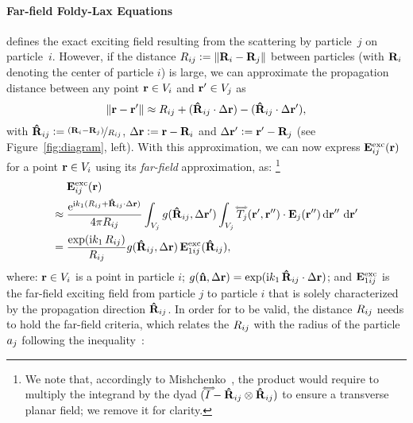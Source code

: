 \paragraph{Far-field Foldy-Lax Equations}
 defines the exact exciting field resulting from the scattering by particle~$j$ on particle~$i$.
However, if the distance $R_{ij} \vcentcolon= \| \mathbf{R}_i - \mathbf{R}_j \|$ between particles (with $\mathbf{R}_i$ denoting the center of particle $i$) is large, we can approximate the propagation distance between any point $\mathbf{r} \in V_i$ and $\mathbf{r}' \in V_j$ as
%
\begin{equation}
    \| \mathbf{r} - \mathbf{r}' \| \approx R_{ij} + (\mathbf{\hat{R}}_{ij} \cdot {\Delta}\mathbf{r}) -  (\mathbf{\hat{R}}_{ij} \cdot {\Delta}\mathbf{r}'),
\end{equation}
%
with $\mathbf{\hat{R}}_{ij} \vcentcolon= \nicefrac{(\mathbf{R}_i - \mathbf{R}_j)}{R_{ij}}$, ${\Delta}\mathbf{r} \vcentcolon= \mathbf{r} - \mathbf{R}_i$ and ${\Delta}\mathbf{r}' \vcentcolon= \mathbf{r}' - \mathbf{R}_j$ (see Figure~\ref{fig:diagram}, left).
With this approximation, we can now express $\mathbf{E}^\text{exc}_{ij}(\mathbf{r})$ for a point $\mathbf{r} \in V_i$ using its \emph{far-field} approximation, as:%
\footnote{We note that, accordingly to Mishchenko~, the product would require to multiply the integrand by the dyad $(\accentset{\Longleftrightarrow}{I} - \mathbf{\hat{R}}_{ij}\otimes\mathbf{\hat{R}}_{ij})$ to ensure a transverse planar field; we remove it for clarity.}
%
\begin{equation}
    \begin{split}
        & \ExcEField_{ij}(\px)\\
        \approx\;& \frac{\E^{\img k_1 (\tPx_{ij}+\dPx_{ij}\cdot{\Delta}\px)}}{4\pi\tPx_{ij}} \int_{V_j} \sGreenProp(\dPx_{ij},{\Delta}\px') \int_{V_j} \dyad{T}_j(\px',\px'')\cdot \EField_j(\px'') \diff{\px''}\,\diff{\px'} \\
        =\;& \frac{\exp(\img k_1 \,\tPx_{ij})}{\tPx_{ij}} 
        \sGreenProp(\dPx_{ij}, \Delta \px) \,\ExcEField_{1ij}(\dPx_{ij}),
    \end{split}
    \label{eq:excfieldfar}
    \raisetag{17pt}
\end{equation}
%
where: $\mathbf{r} \in V_i$ is a point in particle $i$; $g(\mathbf{\hat{n}}, \Delta \mathbf{r})=\exp(\text{i} k_1 \,\mathbf{\hat{R}}_{ij}\cdot{\Delta}\mathbf{r})$; and $\mathbf{E}^\text{exc}_{1ij}$ is the far-field exciting field from particle $j$ to particle $i$ that is solely characterized by the propagation direction $\mathbf{\hat{R}}_{ij}$. In order for  to be valid, the distance $R_{ij}$ needs to hold the far-field criteria, which relates the $R_{ij}$ with the radius of the particle $a_j$ following the inequality~\cite{mishchenko2006multiple}:
